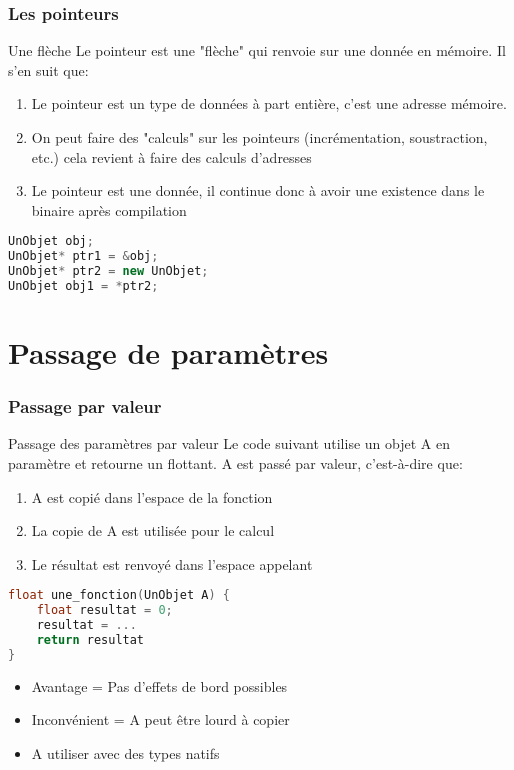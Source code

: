 \documentclass{beamer}
\begin{document}
\begin{frame}[fragile=singleslide,shrink=20]
\frametitle {Les pointeurs}

\begin{block}{Une flèche}
Le pointeur est une "flèche" qui renvoie sur une donnée en mémoire. Il s'en suit que:
\begin{enumerate}
\item Le pointeur est un type de données à part entière, c'est une adresse mémoire.
\item On peut faire des "calculs" sur les pointeurs (incrémentation, soustraction, etc.) cela revient à faire des calculs d'adresses
\item Le pointeur est une donnée, il continue donc à avoir une existence dans le binaire après compilation
\end{enumerate}
\end{block}

\begin{lstlisting}[language=c++]
UnObjet obj;
UnObjet* ptr1 = &obj;
UnObjet* ptr2 = new UnObjet;
UnObjet obj1 = *ptr2;
\end{lstlisting}
\end{frame}

\section{Passage de paramètres}

\begin{frame}[fragile=singleslide,shrink=20]
\frametitle {Passage par valeur}

\begin{block}{Passage des paramètres par valeur}
Le code suivant utilise un objet A en paramètre et retourne un flottant. A est passé par valeur, c'est-à-dire que:
\begin{enumerate}
\item A est copié dans l'espace de la fonction
\item La copie de A est utilisée pour le calcul
\item Le résultat est renvoyé dans l'espace appelant
\end{enumerate}
\end{block}

\begin{lstlisting}[language=c++]
float une_fonction(UnObjet A) {
    float resultat = 0;
    resultat = ...
    return resultat
}
\end{lstlisting}

\begin{block}{}
\begin{itemize}
\item Avantage = Pas d'effets de bord possibles
\item Inconvénient = A peut être lourd à copier
\item A utiliser avec des types natifs
\end{itemize}
\end{block}
\end{frame}
\end{document}
